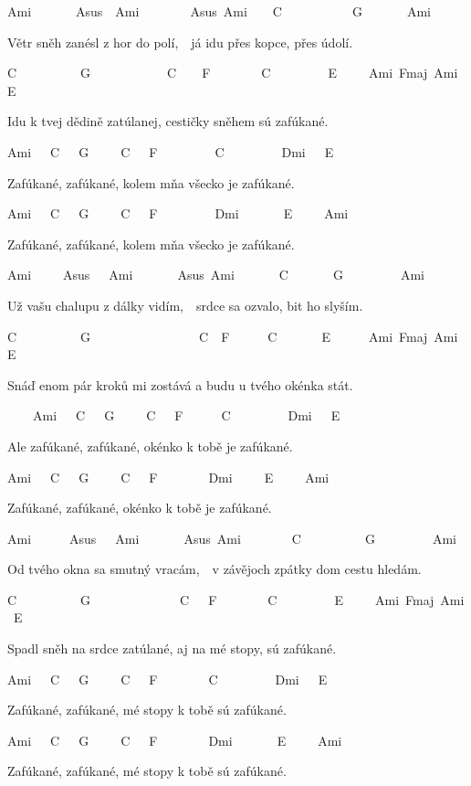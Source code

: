 
Ami~~~~~~~Asus\7~~Ami~~~~~~~~Asus\7~Ami~~~~C~~~~~~~~~~~G~~~~~~~Ami

Větr sněh zanésl z hor do polí,~~já idu přes kopce, přes údolí.

C~~~~~~~~~~G~~~~~~~~~~~~C~~~~F~~~~~~~~C~~~~~~~~~E~~~~~Ami~Fmaj\7~Ami~E

Idu k tvej dědině zatúlanej, cestičky sněhem sú zafúkané.

\bigskip

\begin{chorustext}
Ami~~~C~~~G~~~~~C~~~F~~~~~~~~~C~~~~~~~~~Dmi~~~E~~

Zafúkané, zafúkané, kolem mňa všecko je zafúkané.

Ami~~~C~~~G~~~~~C~~~F~~~~~~~~~Dmi~~~~~~~E~~~~~Ami

Zafúkané, zafúkané, kolem mňa všecko je zafúkané.

\end{chorustext}

\bigskip

Ami~~~~~Asus\7~~~Ami~~~~~~~Asus\7~Ami~~~~~~~C~~~~~~~G~~~~~~~~~Ami

Už vašu chalupu z dálky vidím,~~srdce sa ozvalo, bit ho slyším.

C~~~~~~~~~~G~~~~~~~~~~~~~~~~~C~~F~~~~~~C~~~~~~~E~~~~~~Ami~Fmaj\7~Ami~E

Snáď enom pár kroků mi zostává a budu u tvého okénka stát.

\bigskip

\begin{chorustext}

~~~~Ami~~~C~~~G~~~~~C~~~F~~~~~~C~~~~~~~~~Dmi~~~E

Ale zafúkané, zafúkané, okénko k tobě je zafúkané.

Ami~~~C~~~G~~~~~C~~~F~~~~~~~~Dmi~~~~~E~~~~~Ami

Zafúkané, zafúkané, okénko k tobě je zafúkané.

\end{chorustext}

\bigskip

Ami~~~~~~Asus\7~~~Ami~~~~~~~Asus\7~Ami~~~~~~~~C~~~~~~~~~~G~~~~~~~~~Ami

Od tvého okna sa smutný vracám,~~v závějoch zpátky dom cestu hledám.

C~~~~~~~~~~G~~~~~~~~~~~~~~C~~~F~~~~~~~~C~~~~~~~~~E~~~~~Ami~Fmaj\7~Ami~E

Spadl sněh na srdce zatúlané, aj na mé stopy, sú zafúkané.

\bigskip

\begin{chorustext}

Ami~~~C~~~G~~~~~C~~~F~~~~~~~~C~~~~~~~~~Dmi~~~E~

Zafúkané, zafúkané, mé stopy k tobě sú zafúkané.

Ami~~~C~~~G~~~~~C~~~F~~~~~~~~Dmi~~~~~~~E~~~~~Ami

Zafúkané, zafúkané, mé stopy k tobě sú zafúkané.

\end{chorustext}